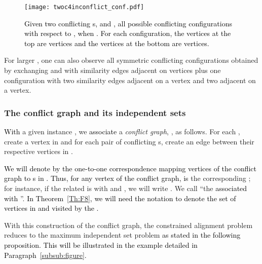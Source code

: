 \documentclass[final]{dmtcs-episciences}
\newcommand\mar[1]{\textcolor{black}{#1}}
\newcommand\ces[1]{\textcolor{black}{#1}}
\begin{document}
\begin{figure}[t]	   
\begin{center}	   
\texttt{[image: twoc4inconflict\_conf.pdf]} 
\caption{\sf \ces{Given two conflicting s,  and , all possible conflicting configurations with respect to , when . 
For each configuration, the vertices at the top are  vertices and the vertices at the bottom are  vertices. }}
\label{twoc4}	   
\end{center}	   
\vspace*{-.4cm}	   
\end{figure} 





  

  


For larger , one can also observe all symmetric conflicting configurations obtained by exchanging  and  with similarity edges adjacent on  vertices plus one configuration with two similarity edges adjacent on a  vertex and two adjacent on a  vertex.

\subsubsection{The conflict graph and its independent sets}

\mar{With} a given instance , we \mar{associate} a  \emph{ conflict graph}, \mar{}, as follows. 
 For each , create a vertex in \mar{} and for each pair of conflicting s, create an edge between their respective vertices in \mar{}. 


\mar{We will denote by  the one-to-one correspondence mapping vertices of the conflict graph  to s in .
Thus, 
for any vertex  of the conflict graph,  is} the corresponding ; for instance, if the related  is  with  and , we will write . We 
call  ``the  \mar{associated with} ''. \mar{In Theorem~\ref{Th:F8}, we will need the notation  to denote the set of vertices in  and visited by the  .}  





With this construction of the conflict graph, the constrained alignment problem  reduces to the maximum independent set problem \mar{as stated in the following proposition. This will be illustrated in the example detailed in Paragraph~\ref{subsub:figure}.}
\end{document}
